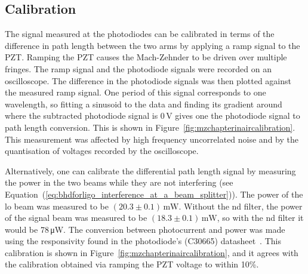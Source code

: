 \subsection{Calibration}
\label{sec:mz_chapter_in_air_cal}
The signal measured at the photodiodes can be calibrated in terms of the difference in path length between the two arms by applying a ramp signal to the PZT. Ramping the PZT causes the Mach-Zehnder to be driven over multiple fringes. The ramp signal and the photodiode signals were recorded on an oscilloscope. The difference in the photodiode signals was then plotted against the measured ramp signal. One period of this signal corresponds to one wavelength, so fitting a sinusoid to the data and finding its gradient around where the subtracted photodiode signal is 0\,V gives one the photodiode signal to path length conversion. This is shown in Figure~\ref{fig:mzchapterinaircalibration}. This measurement was affected by high frequency uncorrelated noise and by the quantisation of voltages recorded by the oscilloscope.
\par
Alternatively, one can calibrate the differential path length signal by measuring the power in the two beams while they are not interfering (see Equation~(\ref{eq:bhdforligo_interference_at_a_beam_splitter})). The power of the \gls{lo} beam was measured to be $(20.3\pm0.1)\,\si{\milli\watt}$. Without the \gls{nd} filter, the power of the signal beam was measured to be $(18.3\pm0.1)\,\si{\milli\watt}$, so with the \gls{nd} filter it would be 78\,\si{\micro\watt}. The conversion between photocurrent and power was made using the responsivity found in the photodiode's (C30665) datasheet~\cite{c30655}. This calibration is shown in Figure~\ref{fig:mzchapterinaircalibration}, and it agrees with the calibration obtained via ramping the PZT voltage to within 10\%.
